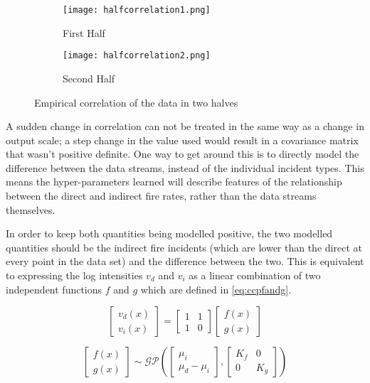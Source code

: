 \documentclass[a4paper,11pt]{report}
\begin{document}
\begin{figure}
\centering
\begin{subfigure}{.5\textwidth}
	\centering
	\texttt{[image: halfcorrelation1.png]}
  	\caption{First Half}
  	\label{fig:sub1}
\end{subfigure}%
\begin{subfigure}{.5\textwidth}
  	\centering
  	\texttt{[image: halfcorrelation2.png]}
  	\caption{Second Half}
 	 \label{fig:sub2}
\end{subfigure}
\caption{Empirical correlation of the data in two halves}
\label{fig:halfcorrelation}
\end{figure}

A sudden change in correlation can not be treated in the same way as a change in output scale; a step change in the value used would result in a covariance matrix that wasn't positive definite. One way to get around this is to directly model the difference between the data streams, instead of the individual incident types. This means the hyper-parameters learned will describe features of the relationship between the direct and indirect fire rates, rather than the data streams themselves. \par 

In order to keep both quantities being modelled positive, the two modelled quantities should be the indirect fire incidents (which are lower than the direct at every point in the data set) and the difference between the two. This is equivalent to expressing the log intensities \(v_d\) and \(v_i\) as a linear combination of two independent functions \(f\) and \(g\) which are defined in \ref{eq:ccpfandg}.

\begin{equation} 
\left[ \begin{array}{cc}
v_{d}(x)  \\
v_{i}(x) \end{array} \right] = \left[ \begin{array}{cc}
1 & 1  \\
1  & 0 \end{array} \right] \left[ \begin{array}{cc}
f(x)  \\
g(x) \end{array} \right]
\end{equation}

\begin{equation} \label{eq:ccpfandg}
\left[ \begin{array}{cc}
f(x)  \\
g(x) \end{array} \right] \sim \mathcal{G}\mathcal{P} \left( \left[ \begin{array}{cc}
\mu_i  \\
\mu_d - \mu_i \end{array} \right], \left[ \begin{array}{cc}
K_f & 0  \\
0  & K_g \end{array} \right] \right)
\end{equation}
\end{document}
